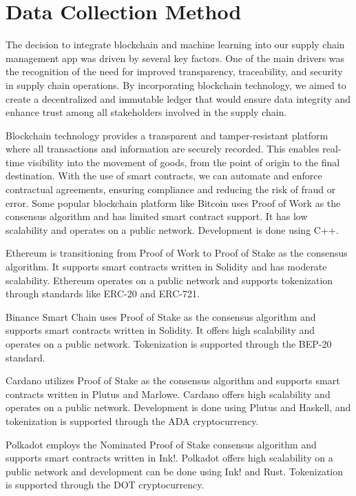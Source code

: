 \section{Data Collection Method}


\noindent The decision to integrate blockchain and machine learning into our supply chain management app was driven by several key factors. One of the main drivers was the recognition of the need for improved transparency, traceability, and security in supply chain operations. By incorporating blockchain technology, we aimed to create a decentralized and immutable ledger that would ensure data integrity and enhance trust among all stakeholders involved in the supply chain.
\par Blockchain technology provides a transparent and tamper-resistant platform where all transactions and information are securely recorded. This enables real-time visibility into the movement of goods, from the point of origin to the final destination. With the use of smart contracts, we can automate and enforce contractual agreements, ensuring compliance and reducing the risk of fraud or error. Some popular blockchain platform like Bitcoin uses Proof of Work as the consensus algorithm and has limited smart contract support. It has low scalability and operates on a public network. Development is done using C++.

Ethereum is transitioning from Proof of Work to Proof of Stake as the consensus algorithm. It supports smart contracts written in Solidity and has moderate scalability. Ethereum operates on a public network and supports tokenization through standards like ERC-20 and ERC-721.

Binance Smart Chain uses Proof of Stake as the consensus algorithm and supports smart contracts written in Solidity. It offers high scalability and operates on a public network. Tokenization is supported through the BEP-20 standard.

Cardano utilizes Proof of Stake as the consensus algorithm and supports smart contracts written in Plutus and Marlowe. Cardano offers high scalability and operates on a public network. Development is done using Plutus and Haskell, and tokenization is supported through the ADA cryptocurrency.

Polkadot employs the Nominated Proof of Stake consensus algorithm and supports smart contracts written in Ink!. Polkadot offers high scalability on a public network and development can be done using Ink! and Rust. Tokenization is supported through the DOT cryptocurrency.

